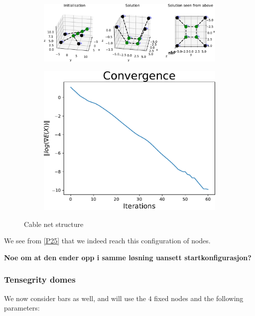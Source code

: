 \begin{figure}[!ht]
\centering
\begin{subfigure}{.75\textwidth}
  \centering
  \includegraphics[width=0.99\linewidth]{Bilder/p25.pdf}
\end{subfigure}%
\begin{subfigure}{.28\textwidth}
  \centering
  \includegraphics[width=0.99\linewidth]{Bilder/P25conv.pdf}
  \label{fig:sub2}
\end{subfigure}
\caption{Cable net structure}
\label{P25}
\end{figure}

We see from \eqref{P25} that we indeed reach this configuration of nodes. 

\textbf{Noe om at den ender opp i samme løsning uansett startkonfigurasjon?}

\subsubsection{Tensegrity domes}
We now consider bars as well, and will use the $4$ fixed nodes and the following parameters:

